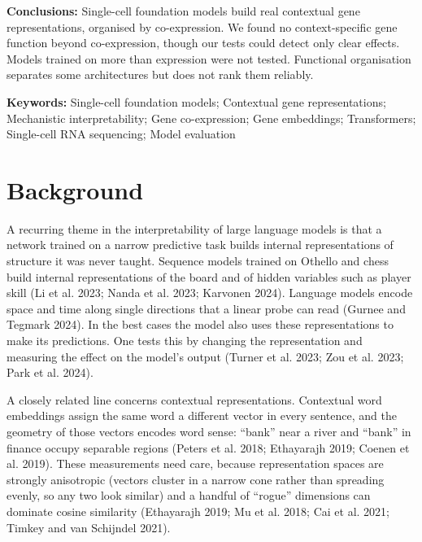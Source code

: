 \documentclass[
  11pt,
]{article}
\begin{document}
\textbf{Conclusions:} Single-cell foundation models build real
contextual gene representations, organised by co-expression. We found no
context-specific gene function beyond co-expression, though our tests
could detect only clear effects. Models trained on more than expression
were not tested. Functional organisation separates some architectures
but does not rank them reliably.

\textbf{Keywords:} Single-cell foundation models; Contextual gene
representations; Mechanistic interpretability; Gene co-expression; Gene
embeddings; Transformers; Single-cell RNA sequencing; Model evaluation

\section{Background}\label{background}

A recurring theme in the interpretability of large language models is
that a network trained on a narrow predictive task builds internal
representations of structure it was never taught. Sequence models
trained on Othello and chess build internal representations of the board
and of hidden variables such as player skill (Li et al. 2023; Nanda et
al. 2023; Karvonen 2024). Language models encode space and time along
single directions that a linear probe can read (Gurnee and Tegmark
2024). In the best cases the model also uses these representations to
make its predictions. One tests this by changing the representation and
measuring the effect on the model's output (Turner et al. 2023; {Zou et
al.} 2023; Park et al. 2024).

A closely related line concerns contextual representations. Contextual
word embeddings assign the same word a different vector in every
sentence, and the geometry of those vectors encodes word sense: ``bank''
near a river and ``bank'' in finance occupy separable regions (Peters et
al. 2018; Ethayarajh 2019; Coenen et al. 2019). These measurements need
care, because representation spaces are strongly anisotropic (vectors
cluster in a narrow cone rather than spreading evenly, so any two look
similar) and a handful of ``rogue'' dimensions can dominate cosine
similarity (Ethayarajh 2019; Mu et al. 2018; Cai et al. 2021; {Timkey
and van Schijndel} 2021).
\end{document}

